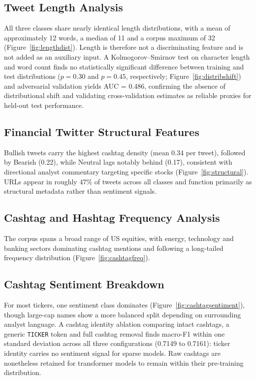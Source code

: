\documentclass[11pt,a4paper]{article}
\begin{document}
\subsection{Tweet Length Analysis}

All three classes share nearly identical length distributions, with a mean of approximately
12 words, a median of 11 and a corpus maximum of 32 (Figure~\ref{fig:lengthdist}). Length
is therefore not a discriminating feature and is not added as an auxiliary input. A
Kolmogorov--Smirnov test on character length and word count finds no statistically
significant difference between training and test distributions ($p = 0.30$ and
$p = 0.45$, respectively; Figure~\ref{fig:distribshift}) and adversarial validation
yields AUC = 0.486, confirming the absence of distributional shift and validating
cross-validation estimates as reliable proxies for held-out test performance.

\subsection{Financial Twitter Structural Features}

Bullish tweets carry the highest cashtag density (mean 0.34 per tweet), followed by
Bearish (0.22), while Neutral lags notably behind (0.17), consistent with directional
analyst commentary targeting specific stocks (Figure~\ref{fig:structural}). URLs appear
in roughly 47\% of tweets across all classes and function primarily as structural metadata
rather than sentiment signals.

\subsection{Cashtag and Hashtag Frequency Analysis}

The corpus spans a broad range of US equities, with energy, technology and banking sectors
dominating cashtag mentions and following a long-tailed frequency distribution
(Figure~\ref{fig:cashtagfreq}).

\subsection{Cashtag Sentiment Breakdown}

For most tickers, one sentiment class dominates (Figure~\ref{fig:cashtagsentiment}),
though large-cap names show a more balanced split depending on surrounding analyst
language. A cashtag identity ablation comparing intact cashtags, a generic
\texttt{TICKER} token and full cashtag removal finds macro-F1 within one standard
deviation across all three configurations (0.7149 to 0.7161): ticker identity carries no
sentiment signal for sparse models. Raw cashtags are nonetheless retained for transformer
models to remain within their pre-training distribution.
\end{document}

